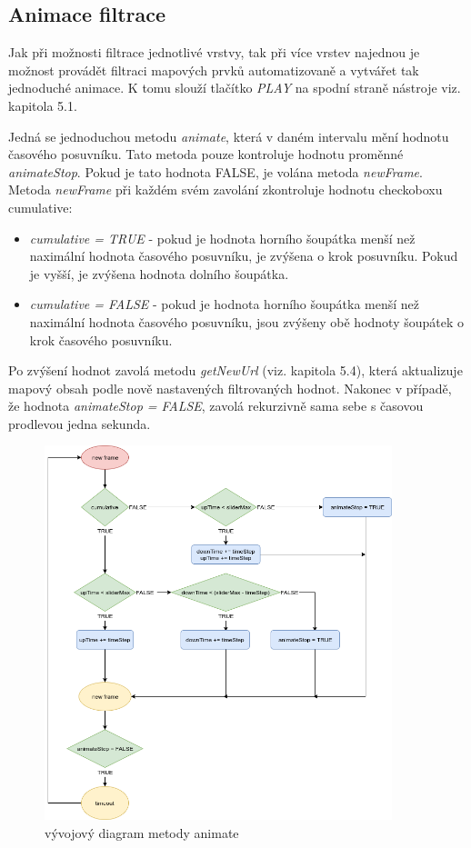 \subsection{Animace filtrace}

Jak při možnosti filtrace jednotlivé vrstvy, tak při více vrstev najednou je možnost provádět filtraci mapových prvků automatizovaně a vytvářet tak jednoduché animace. K tomu slouží tlačítko \textit{PLAY} na spodní straně nástroje viz. kapitola 5.1.

Jedná se jednoduchou metodu \textit{animate}, která v daném intervalu mění hodnotu časového posuvníku. Tato metoda pouze kontroluje hodnotu proměnné \textit{animateStop}. Pokud je tato hodnota FALSE, je volána metoda \textit{newFrame}. Metoda \textit{newFrame} při každém svém zavolání zkontroluje hodnotu checkoboxu cumulative:
\begin{itemize}
	\item\textit{cumulative = TRUE} - pokud je hodnota horního šoupátka menší než naximální hodnota časového posuvníku, je zvýšena o krok posuvníku. Pokud je vyšší, je zvýšena hodnota dolního šoupátka.
	\item\textit{cumulative = FALSE} - pokud je hodnota horního šoupátka menší než naximální hodnota časového posuvníku, jsou zvýšeny obě hodnoty šoupátek o krok časového posuvníku.
\end{itemize}
Po zvýšení hodnot zavolá metodu \textit{getNewUrl} (viz. kapitola 5.4), která aktualizuje mapový obsah podle nově nastavených filtrovaných hodnot. Nakonec v případě, že hodnota \textit{animateStop = FALSE}, zavolá rekurzivně sama sebe s časovou prodlevou jedna sekunda. 

\begin{figure}[h!]
	\centering
	\includegraphics[width=0.9\textwidth]{../img/animate.png}
	\caption{vývojový diagram metody animate}
	\label{fig:animate-chart}
\end{figure}
